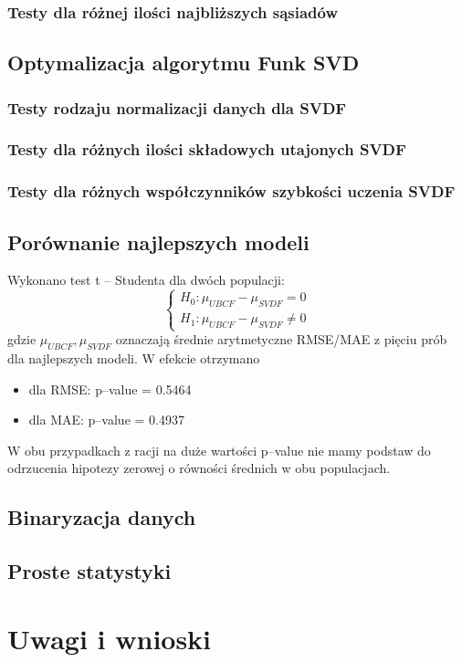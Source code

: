 \documentclass[12pt]{article}
\begin{document}
\begin{flushleft}
\subsubsection{Testy dla różnej ilości najbliższych sąsiadów}
\subsection{Optymalizacja algorytmu Funk SVD}
\subsubsection{Testy rodzaju normalizacji danych dla SVDF}
\subsubsection{Testy dla różnych ilości składowych utajonych SVDF}
\subsubsection{Testy dla różnych współczynników szybkości uczenia SVDF}
\subsection{Porównanie najlepszych modeli}

Wykonano test t -- Studenta dla dwóch populacji:
$$\begin{cases} H_0: \mu_{UBCF} - \mu_{SVDF} = 0\\ 
H_1: \mu_{UBCF} - \mu_{SVDF} \neq 0
\end{cases}$$
gdzie $\mu_{UBCF}, \mu_{SVDF}$ oznaczają średnie arytmetyczne RMSE/MAE z pięciu prób dla najlepszych modeli. W efekcie otrzymano
\begin{itemize}
\item dla RMSE: p--value = 0.5464
\item dla MAE: p--value = 0.4937
\end{itemize}
W obu przypadkach z racji na duże wartości p--value nie mamy podstaw do odrzucenia hipotezy zerowej o równości średnich w obu populacjach.
\subsection{Binaryzacja danych}
\subsection{Proste statystyki}
\section{Uwagi i wnioski}


\end{flushleft}
\end{document}
